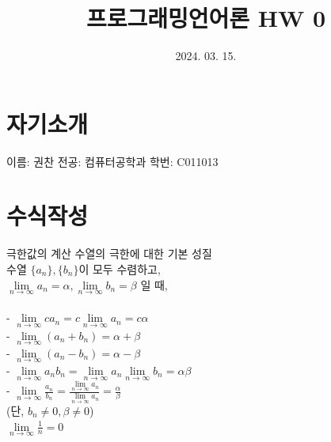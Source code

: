 \documentclass{article}
\title{프로그래밍언어론 HW 0}
\date{2024. 03. 15.}
\begin{document}
\maketitle
\section{자기소개}
이름: 권찬\newline
전공: 컴퓨터공학과\newline
학번: C011013

\section{수식작성}
극한값의 계산\newline
수열의 극한에 대한 기본 성질\\
수열 $\{a_n\}, \{b_n\}$이 모두 수렴하고,\\
$\lim\limits_{n\to\infty} a_n  = \alpha, \lim\limits_{n\to\infty} b_n = \beta$ 일 때,\\\\
- $\lim\limits_{n\to\infty} ca_n  = c\lim\limits_{n\to\infty} a_n = c\alpha$\\
- $\lim\limits_{n\to\infty} (a_n + b_n)  = \alpha + \beta$\\
- $\lim\limits_{n\to\infty} (a_n - b_n)  = \alpha - \beta$\\
- $\lim\limits_{n\to\infty} a_n b_n = \lim\limits_{n\to\infty} a_n \lim\limits_{n\to\infty} b_n = \alpha \beta$\\
- $\lim\limits_{n\to\infty} \frac{a_n}{b_n} = \frac{\lim\limits_{n\to\infty} a_n}{\lim\limits_{n\to\infty} a_n} =\frac{\alpha}{\beta}$\\
(단, $b_n \neq 0, \beta \neq 0$)\\
$\lim\limits_{n\to\infty} \frac{1}{n} = 0$
\newpage
\end{document}
